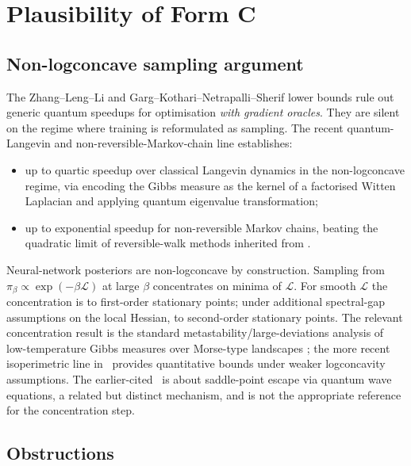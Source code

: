 \documentclass[11pt,a4paper]{article}
\theoremstyle{definition}
\newcommand{\loss}{\mathcal{L}}
\begin{document}
\section{Plausibility of Form C}\label{sec:formC}

\subsection{Non-logconcave sampling argument}

The Zhang--Leng--Li \cite{ZhangLengLi2023} and Garg--Kothari--Netrapalli--Sherif \cite{GKNS2021} lower bounds rule out generic quantum speedups for optimisation \emph{with gradient oracles}. They are silent on the regime where training is reformulated as sampling. The recent quantum-Langevin and non-reversible-Markov-chain line \cite{QuantumNonLogconcave2025,QuantumMCMCOpt2025} establishes:
\begin{itemize}[itemsep=0pt]
\item up to quartic speedup over classical Langevin dynamics in the non-logconcave regime, via encoding the Gibbs measure as the kernel of a factorised Witten Laplacian and applying quantum eigenvalue transformation;
\item up to exponential speedup for non-reversible Markov chains, beating the quadratic limit of reversible-walk methods inherited from \cite{Szegedy2004,MNRS2011}.
\end{itemize}
Neural-network posteriors are non-logconcave by construction. Sampling from $\pi_\beta \propto \exp(-\beta\loss)$ at large $\beta$ concentrates on minima of $\loss$. For smooth $\loss$ the concentration is to first-order stationary points; under additional spectral-gap assumptions on the local Hessian, to second-order stationary points. The relevant concentration result is the standard metastability/large-deviations analysis of low-temperature Gibbs measures over Morse-type landscapes \cite{BovierDenHollander2015}; the more recent isoperimetric line in~\cite{EldanLeeLehec2020} provides quantitative bounds under weaker logconcavity assumptions. The earlier-cited~\cite{ZhangLengLi2021} is about saddle-point escape via quantum wave equations, a related but distinct mechanism, and is not the appropriate reference for the concentration step.

\subsection{Obstructions}
\end{document}
